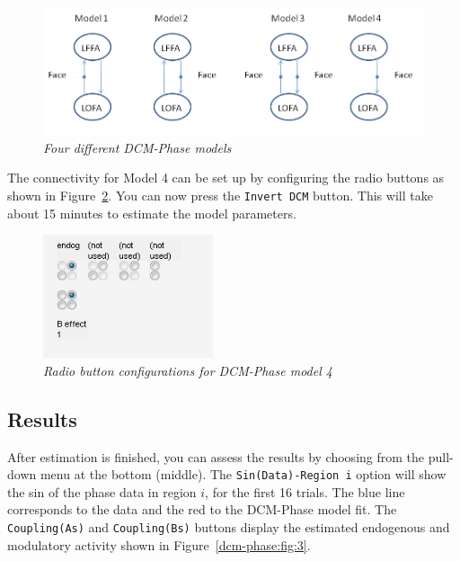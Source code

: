 \begin{figure}
\begin{center}
\includegraphics[width=160mm]{multimodal/figures/phase-models}
\caption{\em Four different DCM-Phase models  \label{dcm-phase:fig:1}}
\end{center}
\end{figure}

The connectivity for Model 4 can be set up by configuring the radio buttons as shown in Figure~\ref{dcm-phase:fig:2}. You can now press the \texttt{Invert DCM} button. This will take about 15 minutes to estimate the model parameters.

\begin{figure}
\begin{center}
\includegraphics[width=50mm]{multimodal/figures/model4_conn}
\caption{\em Radio button configurations for DCM-Phase model 4  \label{dcm-phase:fig:2}}
\end{center}
\end{figure}

\subsection{Results}

After estimation is finished, you can assess the results by choosing from the pull-down menu at the bottom (middle). The \texttt{Sin(Data)-Region i} option will show the sin of the phase data in region $i$, for the first 16 trials. The blue line corresponds to the data and the red to the DCM-Phase model fit. The 
\texttt{Coupling(As)} and \texttt{Coupling(Bs)} buttons display the estimated endogenous and modulatory activity shown in Figure~\ref{dcm-phase:fig:3}.

